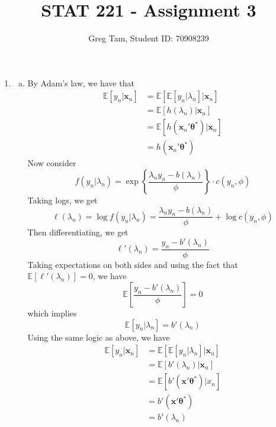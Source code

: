 \documentclass[letterpaper,10pt]{amsart}
\newcommand{\E}[1]{\mathbb{E}\!\left[#1\right]}
\begin{document}
\title{STAT 221 - Assignment 3}
\author{Greg Tam, Student ID: 70908239}
\date{}
\maketitle


\begin{enumerate}[1.]
\item
\begin{enumerate}[(a)]
\item
By Adam's law, we have that
\begin{align*}
\E{y_n | \boldsymbol x_n} &= \E{\E{y_n | \lambda_n} | \boldsymbol x_n}\\
&= \E{h(\lambda_n) | \boldsymbol x_n}\\
&= \E{h(\boldsymbol x_n' \boldsymbol \theta^*) | \boldsymbol x_n}\\
&= h(\boldsymbol x_n' \boldsymbol \theta^*)
\end{align*}
Now consider
\[f(y_n | \lambda_n) = \exp\left\{\frac{\lambda_n y_n - b(\lambda_n)}{\phi}\right\} \cdot c(y_n, \phi)\]
Taking logs, we get
\[\ell(\lambda_n) = \log f(y_n | \lambda_n) = \frac{\lambda_n y_n - b(\lambda_n)}{\phi} + \log c(y_n, \phi)\]
Then differentiating, we get
\[\ell'(\lambda_n) = \frac{y_n - b'(\lambda_n)}{\phi}\]
Taking expectations on both sides and using the fact that $\E{\ell'(\lambda_n)}=0$, we have
\[\E{\frac{y_n - b'(\lambda_n)}{\phi}}=0\]
which implies
\[\E{y_n | \lambda_n} = b'(\lambda_n)\]
Using the same logic as above, we have
\begin{align*}
\E{y_n | \boldsymbol x_n} &= \E{\E{y_n | \lambda_n} | \boldsymbol x_n}\\
&= \E{b'(\lambda_n) | \boldsymbol x_n}\\
&= \E{b'(\boldsymbol x' \boldsymbol \theta^*) | x_n}\\
&= b'(\boldsymbol x' \boldsymbol \theta^*)\\
&= b'(\lambda_n)
\end{align*}



\end{enumerate}
\end{enumerate}
\end{document}
